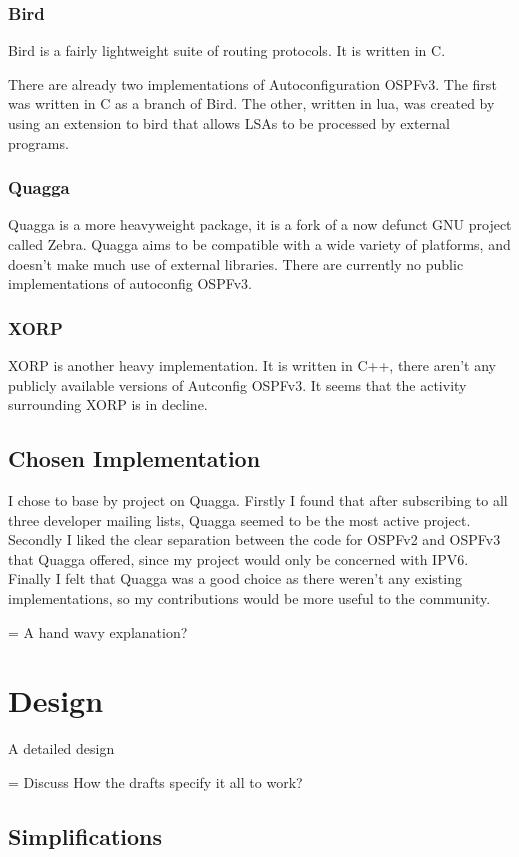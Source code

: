 \documentclass[12pt]{report}
\begin{document}
\subsection{Bird}
Bird is a fairly lightweight suite of routing protocols. It is written in C. 

There are already two implementations of Autoconfiguration OSPFv3. The first
was written in C as a branch of Bird. The other, written in lua, was created by
using an extension to bird that allows LSAs to be processed by external
programs.

\subsection{Quagga}
Quagga is a more heavyweight package, it is a fork of a now defunct GNU project
called Zebra. Quagga aims to be compatible with a wide variety of platforms,
and doesn't make much use of external libraries. There are currently no public
implementations of autoconfig OSPFv3.

\subsection{XORP}
XORP is another heavy implementation. It is written in C++, there aren't any
publicly available versions of Autconfig OSPFv3. It seems that the activity
surrounding XORP is in decline. 

\section{Chosen Implementation}
I chose to base by project on Quagga. Firstly I found that after subscribing to
all three developer mailing lists, Quagga seemed to be the most active project.
Secondly I liked the clear separation between the code for OSPFv2 and OSPFv3
that Quagga offered, since my project would only be concerned with IPV6.
Finally I felt that Quagga was a good choice as there weren't any existing
implementations, so my contributions would be more useful to the community.

= A hand wavy explanation?

\chapter{Design}
A detailed design

= Discuss How the drafts specify it all to work?

\section{Simplifications}
\end{document}

